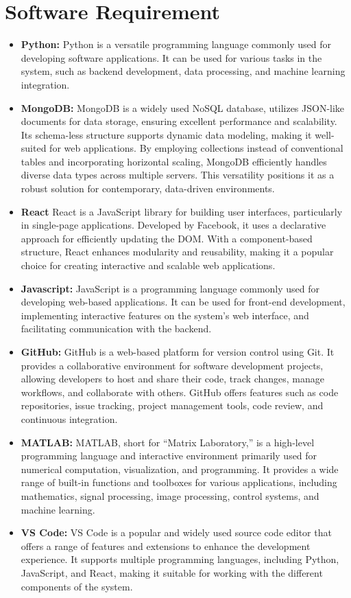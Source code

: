 \section{Software Requirement}
\begin{itemize}[noitemsep]
\item \textbf{Python:} 
Python is a versatile programming language commonly used for \mbox{developing} software applications. It can be used for various tasks in the system, such as backend development, data processing, and machine learning integration.
\item \textbf{MongoDB:}
MongoDB is a widely used NoSQL database, utilizes JSON-like documents for data storage, ensuring excellent performance and scalability. Its schema-less structure supports dynamic data modeling, making it well-suited for web applications. By employing collections instead of conventional tables and incorporating horizontal scaling, MongoDB efficiently handles diverse data types across multiple servers. This versatility positions it as a robust solution for contemporary, data-driven environments.
\item \textbf{React }
 React is a JavaScript library for building user interfaces, particularly in single-page applications. Developed by Facebook, it uses a declarative approach for efficiently updating the DOM. With a component-based structure, React enhances modularity and reusability, making it a popular choice for creating interactive and scalable web applications.
\item \textbf{Javascript:}
JavaScript is a programming language commonly used for developing web-based applications. It can be used for front-end development, implementing interactive features on the system’s web interface, and facilitating communication with the backend. 
\item \textbf{GitHub:}
GitHub is a web-based platform for version control using Git. It provides a collaborative environment for software development projects, allowing developers to host and share their code, track changes, manage workflows, and collaborate with others. GitHub offers features such as code repositories, issue tracking, project management tools, code review, and continuous integration.
\item \textbf{MATLAB:}
MATLAB, short for ``Matrix Laboratory,'' is a high-level programming language and interactive environment primarily used for numerical computation, visualization, and programming. It provides a wide range of built-in functions and toolboxes for various applications, including mathematics, signal processing, image processing, control systems, and machine learning.
\item \textbf{VS Code:}
VS Code is a popular and widely used source code editor that offers a range of features and extensions to enhance the development experience. It supports multiple programming languages, including Python, JavaScript, and React, making it suitable for working with the different components of the system. 
\end{itemize}


